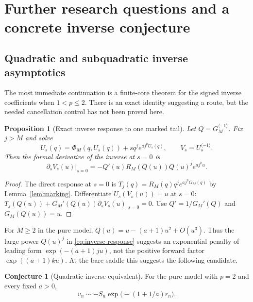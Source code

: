 \documentclass[11pt,a4paper]{article}
\numberwithin{equation}{section}
\newtheorem{proposition}[theorem]{Proposition}
\theoremstyle{definition}
\newtheorem{conjecture}[theorem]{Conjecture}
\theoremstyle{remark}
\begin{document}
\section{Further research questions and a concrete inverse conjecture}
\label{sec:research}

\subsection{Quadratic and subquadratic inverse asymptotics}

The most immediate continuation is a finite-core theorem for the signed
inverse coefficients when $1<p\le2$. There is an exact identity suggesting
a route, but the needed cancellation control has not been proved here.

\begin{proposition}[Exact inverse response to one marked tail]
\label{prop:inverse-response}
Let $Q=G_M^{\langle-1\rangle}$. Fix $j>M$ and solve
\[
 U_s(q)=\Phi_M(q,U_s(q))+s q^j e^{a j^pU_s(q)},
 \qquad V_s=U_s^{\langle-1\rangle}.
\]
Then the formal derivative of the inverse at $s=0$ is
\begin{equation}
 \left.\partial_sV_s(u)\right|_{s=0}
 =-Q'(u)R_M(Q(u))Q(u)^j e^{a j^p u}.
 \label{eq:inverse-response}
\end{equation}
\end{proposition}

\begin{proof}
The direct response at $s=0$ is
$T_j(q)=R_M(q)q^je^{a j^pG_M(q)}$ by Lemma~\ref{lem:marking}.
Differentiate $U_s(V_s(u))=u$ at $s=0$:
$T_j(Q(u))+G_M'(Q(u))\partial_sV_s(u)|_{s=0}=0$.
Use $Q'=1/G_M'(Q)$ and $G_M(Q(u))=u$.
\end{proof}

For $M\ge2$ in the pure model,
$Q(u)=u-(a+1)u^2+O(u^3)$. Thus the large power $Q(u)^j$ in
\eqref{eq:inverse-response} suggests an exponential penalty of leading
form $\exp(-(a+1)ju)$, not the positive forward factor
$\exp((a+1)ku)$. At the bare saddle this suggests the following candidate.

\begin{conjecture}[Quadratic inverse equivalent]
\label{conj:quadratic-inverse}
For the pure model with $p=2$ and every fixed $a>0$,
\begin{equation}
 v_n\sim-S_n\exp\!\bigl(-(1+1/a)r_n\bigr).
 \label{eq:inverse-conjecture}
\end{equation}
\end{conjecture}
\end{document}
